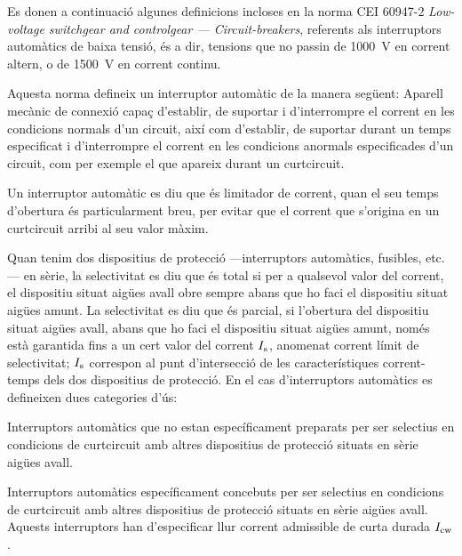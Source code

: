 Es donen a continuació algunes definicions incloses en la norma CEI 60947-2 \textit{Low-voltage switchgear and controlgear --- Circuit-breakers}, referents als interruptors automàtics de baixa tensió, és a dir, tensions que no passin de \qty{1000}{V} en corrent altern, o de \qty{1500}{V} en corrent continu.

Aquesta norma defineix un interruptor automàtic de la manera següent: Aparell mecànic de connexió capaç d'establir, de suportar i d'interrompre el corrent en les condicions normals d'un circuit, així com d'establir, de suportar durant un temps especificat i  d'interrompre el corrent en les condicions anormals especificades d'un circuit, com per exemple el que apareix durant un curtcircuit.

Un interruptor automàtic es diu que és limitador de corrent, quan el seu temps d'obertura és particularment breu, per evitar que el corrent que s'origina en un curtcircuit arribi al seu valor màxim.

Quan tenim dos  dispositius de protecció ---interruptors automàtics, fusibles, etc.--- en sèrie, la selectivitat es diu que és total si per a qualsevol valor del corrent, el dispositiu situat aigües avall obre sempre abans que ho faci el dispositiu situat aigües amunt. La selectivitat es diu que és parcial, si l'obertura del dispositiu situat aigües avall, abans que ho faci el dispositiu situat aigües amunt, només està garantida fins a un cert valor del corrent $I_\mathrm{s}$, anomenat corrent límit de selectivitat; $I_\mathrm{s}$ correspon al punt d'intersecció de les característiques corrent-temps dels dos dispositius de protecció. En el cas d'interruptors automàtics es defineixen dues categories d'ús:
\begin{list}{}
	{\setlength{\labelwidth}{10mm} \setlength{\leftmargin}{15mm} \setlength{\labelsep}{5mm}}
	\item[A] Interruptors automàtics que no estan específicament preparats per ser selectius en condicions de curtcircuit amb altres dispositius de protecció situats en sèrie  aigües avall.
	\item[B] Interruptors automàtics específicament concebuts per ser selectius en condicions de curtcircuit amb altres dispositius de protecció situats en sèrie  aigües avall. Aquests interruptors han d'especificar llur corrent admissible de curta durada $I_\mathrm{cw}$.
\end{list}

